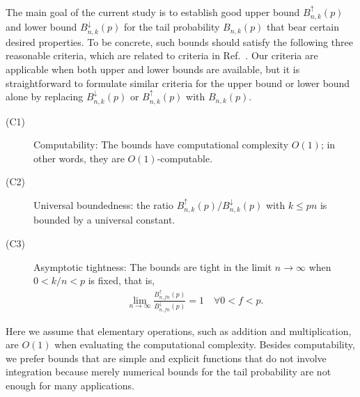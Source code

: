 \documentclass[aop]{imsart}
\theoremstyle{plain}
\theoremstyle{remark}
\newcommand{\1}{\operatorname{\uppercase\expandafter{\romannumeral1}}}
\newcommand{\2}{\operatorname{\uppercase\expandafter{\romannumeral2}}}
\newcommand{\3}{\operatorname{\uppercase\expandafter{\romannumeral3}}}
\newcommand{\4}{\operatorname{\uppercase\expandafter{\romannumeral4}}}
\newcommand{\5}{\operatorname{\uppercase\expandafter{\romannumeral5}}}
\newcommand{\6}{\operatorname{\uppercase\expandafter{\romannumeral6}}}
\newcommand{\7}{\operatorname{\uppercase\expandafter{\romannumeral7}}}
\newcommand{\8}{\operatorname{\uppercase\expandafter{\romannumeral8}}}
\newcommand{\9}{\operatorname{\uppercase\expandafter{\romannumeral9}}}
\newcommand{\rcite}[1]{Ref.~\cite{#1}}
\begin{document}
The main goal of the current study is to establish good upper bound $B_{n,k}^{\uparrow}(p)$ and lower bound $B_{n,k}^{\downarrow}(p)$ for the tail probability $B_{n,k}(p)$ that bear  certain desired properties. 
To be concrete, such bounds should satisfy the following three reasonable criteria, which 
are related to criteria in \rcite{WataH17}.  Our criteria are applicable when both upper and lower bounds are available, but it is straightforward to formulate similar criteria for the upper bound or lower bound alone by replacing  $B_{n,k}^{\downarrow}(p)$ or $B_{n,k}^{\uparrow}(p)$ with $B_{n,k}(p)$.
\begin{description}
	\item[(C1)]
Computability: The bounds have computational complexity $O(1)$; in other words, they are  $O(1)$-computable.	
	
	\item[(C2)]
Universal boundedness: the ratio
$B_{n,k}^\uparrow(p) /B_{n,k}^\downarrow(p)$ with $k\leq pn$ is bounded by 
 a universal constant.
	
	\item[(C3)]
	Asymptotic tightness: The bounds are tight in the limit $n\to\infty$ when $0<k/n<p$ is fixed, that is, 
	\begin{align}
\lim_{n \to \infty}\frac{B_{n,fn}^\uparrow(p)}{B_{n,fn}^\downarrow(p)}=1\quad \forall 0<f<p.  \label{eq:ATratio}
	\end{align}
\end{description}
 Here we assume that elementary operations, such as addition and multiplication, are $O(1)$ when evaluating the computational complexity. Besides computability, we prefer bounds that are simple and explicit  functions that do not involve integration because merely numerical bounds for the tail probability are not enough for many applications. 
 
 
\end{document}
